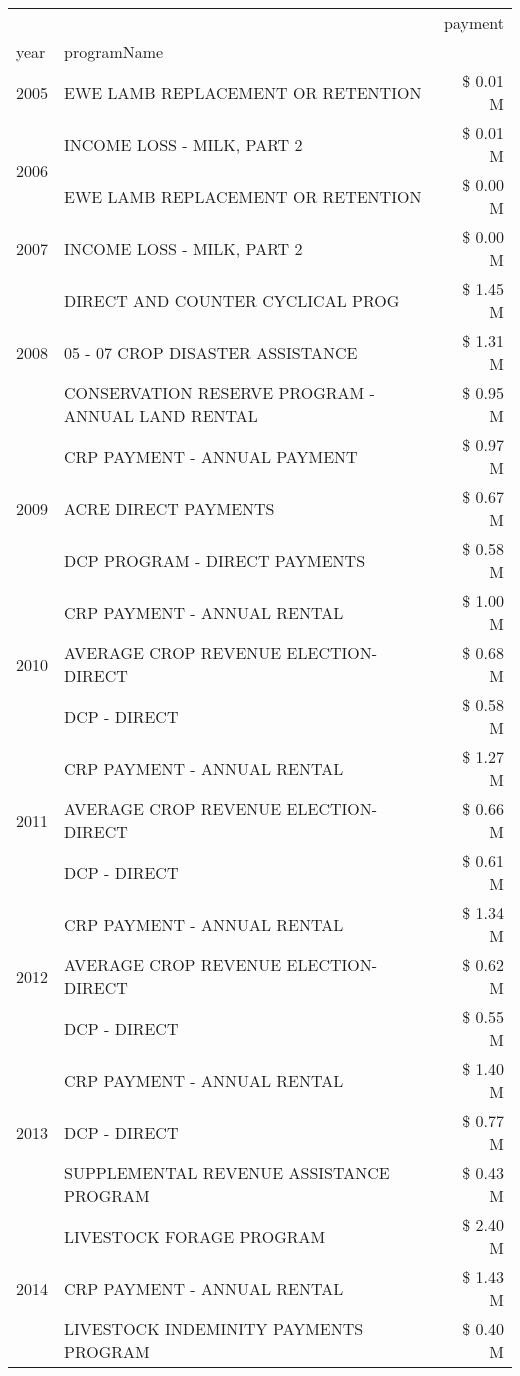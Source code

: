 \begin{tabular}{llr}
\toprule
 &  & payment \\
year & programName &  \\
\midrule
2005 & EWE LAMB REPLACEMENT OR RETENTION & \$ 0.01 M \\
\cline{1-3}
\multirow[t]{2}{*}{2006} & INCOME LOSS - MILK, PART 2 & \$ 0.01 M \\
 & EWE LAMB REPLACEMENT OR RETENTION & \$ 0.00 M \\
\cline{1-3}
2007 & INCOME LOSS - MILK, PART 2 & \$ 0.00 M \\
\cline{1-3}
\multirow[t]{3}{*}{2008} & DIRECT AND COUNTER CYCLICAL PROG & \$ 1.45 M \\
 & 05 - 07 CROP DISASTER ASSISTANCE & \$ 1.31 M \\
 & CONSERVATION RESERVE PROGRAM - ANNUAL LAND RENTAL & \$ 0.95 M \\
\cline{1-3}
\multirow[t]{3}{*}{2009} & CRP PAYMENT - ANNUAL PAYMENT & \$ 0.97 M \\
 & ACRE DIRECT PAYMENTS & \$ 0.67 M \\
 & DCP PROGRAM - DIRECT PAYMENTS & \$ 0.58 M \\
\cline{1-3}
\multirow[t]{3}{*}{2010} & CRP PAYMENT - ANNUAL RENTAL & \$ 1.00 M \\
 & AVERAGE CROP REVENUE ELECTION-DIRECT & \$ 0.68 M \\
 & DCP - DIRECT & \$ 0.58 M \\
\cline{1-3}
\multirow[t]{3}{*}{2011} & CRP PAYMENT - ANNUAL RENTAL & \$ 1.27 M \\
 & AVERAGE CROP REVENUE ELECTION-DIRECT & \$ 0.66 M \\
 & DCP - DIRECT & \$ 0.61 M \\
\cline{1-3}
\multirow[t]{3}{*}{2012} & CRP PAYMENT - ANNUAL RENTAL & \$ 1.34 M \\
 & AVERAGE CROP REVENUE ELECTION-DIRECT & \$ 0.62 M \\
 & DCP - DIRECT & \$ 0.55 M \\
\cline{1-3}
\multirow[t]{3}{*}{2013} & CRP PAYMENT - ANNUAL RENTAL & \$ 1.40 M \\
 & DCP - DIRECT & \$ 0.77 M \\
 & SUPPLEMENTAL REVENUE ASSISTANCE PROGRAM & \$ 0.43 M \\
\cline{1-3}
\multirow[t]{3}{*}{2014} & LIVESTOCK FORAGE PROGRAM & \$ 2.40 M \\
 & CRP PAYMENT - ANNUAL RENTAL & \$ 1.43 M \\
 & LIVESTOCK INDEMINITY PAYMENTS PROGRAM & \$ 0.40 M \\

\end{tabular}
